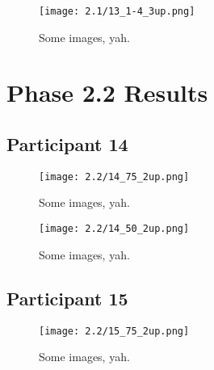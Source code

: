 \clearpage

\begin{figure}[h]
	\begin{center}
	\texttt{[image: 2.1/13\_1-4\_3up.png]}
	\caption{Some images, yah.}
	\end{center}
\end{figure}


\clearpage

\section{Phase 2.2 Results}


\clearpage

\subsection{Participant 14}

\begin{figure}[h]
	\begin{center}
	\texttt{[image: 2.2/14\_75\_2up.png]}
	\caption{Some images, yah.}
	\end{center}
\end{figure}

\clearpage

\begin{figure}[h]
	\begin{center}
	\texttt{[image: 2.2/14\_50\_2up.png]}
	\caption{Some images, yah.}
	\end{center}
\end{figure}


\clearpage

\subsection{Participant 15}

\begin{figure}[h]
	\begin{center}
	\texttt{[image: 2.2/15\_75\_2up.png]}
	\caption{Some images, yah.}
	\end{center}
\end{figure}

